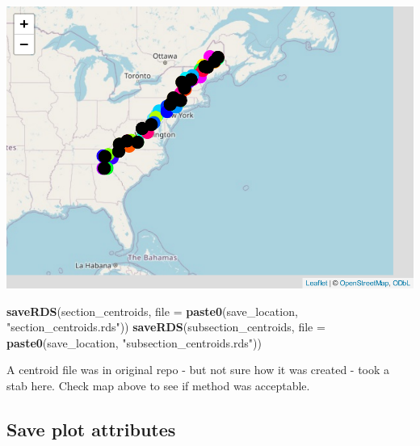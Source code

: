 \documentclass[
]{book}
\newenvironment{Shaded}{\begin{snugshade}}{\end{snugshade}}
\newcommand{\AttributeTok}[1]{\textcolor[rgb]{0.13,0.29,0.53}{#1}}
\newcommand{\FunctionTok}[1]{\textcolor[rgb]{0.13,0.29,0.53}{\textbf{#1}}}
\newcommand{\NormalTok}[1]{#1}
\newcommand{\StringTok}[1]{\textcolor[rgb]{0.31,0.60,0.02}{#1}}
\begin{document}
\includegraphics{_main_files/figure-latex/save-centroids-1.pdf}

\begin{Shaded}
\begin{Highlighting}[]
\FunctionTok{saveRDS}\NormalTok{(section\_centroids, }\AttributeTok{file =} \FunctionTok{paste0}\NormalTok{(save\_location, }\StringTok{"section\_centroids.rds"}\NormalTok{))}
\FunctionTok{saveRDS}\NormalTok{(subsection\_centroids, }\AttributeTok{file =} \FunctionTok{paste0}\NormalTok{(save\_location, }\StringTok{"subsection\_centroids.rds"}\NormalTok{))}
\end{Highlighting}
\end{Shaded}

A centroid file was in original repo - but not sure how it was created - took a stab here. Check map above to see if method was acceptable.

\hypertarget{save-plot-attributes}{%
\subsection{Save plot attributes}\label{save-plot-attributes}}
\end{document}
